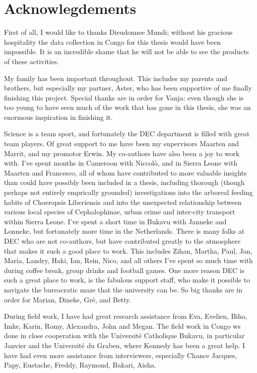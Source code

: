 \pagestyle{fancy}
\chapter*{Acknowlegdements}
First of all, I would like to thanks Dieudonnee Mundi; without his gracious hospitality the data collection in Congo for this thesis would have been impossible. It is an incredible shame that he will not be able to see the products of these activities.

My family has been important throughout. This includes my parents and brothers, but especially my partner, Aster, who has been supportive of me finally finishing this project. Special thanks are in order for Vanja: even though she is too young to have seen much of the work that has gone in this thesis, she was an enormous inspiration in finishing it.

Science is a team sport, and fortunately the DEC department is filled with great team players. Of great support to me have been my supervisors Maarten and Marrit, and my promotor Erwin. My co-authors have also been a joy to work with. I've spent months in Cameroon with Niccolò, and in Sierra Leone with Maarten and Francesco, all of whom have contributed to more valuable insights than could have possibly been included in a thesis, including thorough (though perhaps not entirely emprically grounded) investigations into the arboreal feeding habits of Choeropsis Liberiensis and into the unexpected relationship between various local species of Cephalophinae, urban crime and inter-city transport within Sierra Leone. I've spent a short time in Bukavu with Janneke and Lonneke, but fortunately more time in the Netherlands. There is many folks at DEC who are not co-authors, but have contributed greatly to the atmosphere that makes it such a good place to work. This includes Zihan, Martha, Paul, Jan, Maria, Landry, Haki, Ian, Rein, Nico, and all others I've spent so much time with during coffee break, group drinks and football games. One more reason DEC is such a great place to work, is the fabulous support staff, who make it possible to navigate the bureacratic maze that the university can be. So big thanks are in order for Marian, Dineke, Gré, and Betty.

During field work, I have had great research assistance from Eva, Evelien, Biho, Imke, Karin, Romy, Alexandra, John and Megan. The field work in Congo ws done in close cooperation with the Université Catholique Bukavu, in particular Janvier and the Université du Graben, where Kennedy has been a great help. I have had even more assistance from interviewers, especially Chance Jacques, Papy, Eustache, Freddy, Raymond, Bakari, Aisha. 

